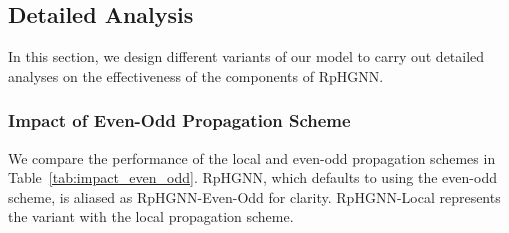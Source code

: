 \documentclass[lettersize,journal]{IEEEtran}
\begin{document}
\begin{table*}[!tp]
  \centering
  \caption{Performance comparison of the local propagation scheme (with  iterations) and the even-odd propagation scheme (with  iterations). Either of them can capture relations within  hops.}
  
  \label{tab:impact_even_odd}
  \end{table*}









\subsection{Detailed Analysis}


In this section, we design different variants of our model to carry out detailed analyses on the effectiveness of the components of RpHGNN.



\subsubsection{Impact of Even-Odd Propagation Scheme}

We compare the performance of the local and even-odd propagation schemes in Table~\ref{tab:impact_even_odd}.
RpHGNN, which defaults to using the even-odd scheme, is aliased as RpHGNN-Even-Odd for clarity.
RpHGNN-Local represents the variant with the local propagation scheme.
\end{document}
